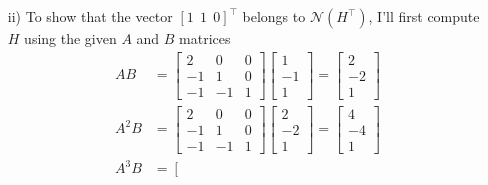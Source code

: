 \begin{homeworkProblem}
\begin{solution}
\begin{itemize}
            \item[ii)] To show that the vector $[ 1 \ \ 1\ \ 0]^\top$ belongs to 
                $\mathcal N(H^\top)$, I'll first compute $H$ using the given $A$ 
                and $B$ matrices
                \[
                    \begin{split}
                        AB &= \left[ \begin{array}{ccc} 
                            2 & 0 & 0 \\ 
                            -1 & 1 & 0 \\ 
                            -1 & -1 & 1 \end{array}
                            \right] 
                            \left[ \begin{array}{c} 
                            1 \\ 
                            -1 \\ 
                            1 \end{array}
                            \right] = \left[ \begin{array}{c} 
                            2 \\ 
                            -2 \\ 
                            1 \end{array}
                            \right] \\
                        A^2B &= \left[ \begin{array}{ccc} 
                            2 & 0 & 0 \\ 
                            -1 & 1 & 0 \\ 
                            -1 & -1 & 1 \end{array}
                            \right] 
                            \left[ \begin{array}{c} 
                            2 \\ 
                            -2 \\ 
                            1 \end{array}
                            \right] = \left[ \begin{array}{c} 
                            4 \\ 
                            -4 \\ 
                            1 \end{array}
                            \right] \\
                        A^3B &= \left[ \begin{array}{ccc} 

\end{array}
\end{split}\]
\end{itemize}
\end{solution}
\end{homeworkProblem}
